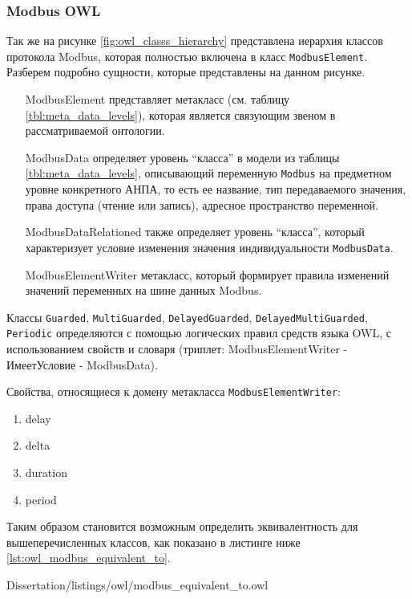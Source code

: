 \subsubsection{Modbus OWL}
Так же на рисунке \ref{fig:owl_classs_hierarchy} представлена иерархия классов протокола Modbus,
которая полностью включена в класс \texttt{ModbusElement}.
Разберем подробно сущности, которые представлены на данном рисунке.
\begin{itemize}
    \item [ModbusElement] представляет метакласс (см. таблицу \ref{tbl:meta_data_levels}),
            которая является связующим звеном в рассматриваемой онтологии.
    \item [ModbusData] определяет уровень ``класса'' в модели из таблицы \ref{tbl:meta_data_levels},
            описывающий переменную \texttt{Modbus} на предметном уровне конкретного АНПА,
            то есть ее название, тип передаваемого значения, права доступа (чтение или запись),
            адресное пространство переменной.
    \item [ModbusDataRelationed] также определяет уровень ``класса'', который характеризует условие изменения значения
            индивидуальности \texttt{ModbusData}.
    \item [ModbusElementWriter] метакласс, который формирует правила изменений значений переменных на шине данных Modbus.
\end{itemize}

Классы \texttt{Guarded}, \texttt{MultiGuarded}, \texttt{DelayedGuarded}, \texttt{DelayedMultiGuarded}, \texttt{Periodic}
определяются с помощью логических правил средств языка OWL, с использованием свойств и словаря (триплет: ModbusElementWriter - ИмеетУсловие - ModbusData).

Свойства, относящиеся к домену метакласса \texttt{ModbusElementWriter}:
\begin{enumerate}
    \item delay
    \item delta
    \item duration
    \item period
\end{enumerate}

Таким образом становится возможным определить эквивалентность для вышеперечисленных классов, как показано в листинге ниже \ref{lst:owl_modbus_equivalent_to}.

        {Dissertation/listings/owl/modbus_equivalent_to.owl}



